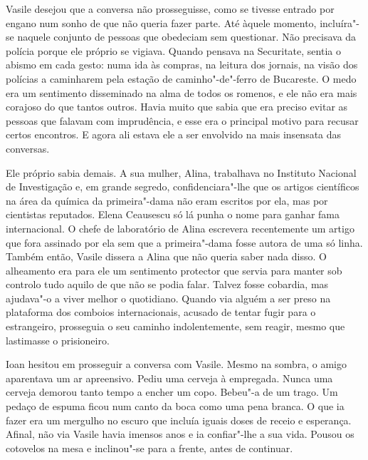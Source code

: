 Vasile desejou que a conversa não prosseguisse, como se tivesse entrado
por engano num sonho de que não queria fazer parte. Até àquele momento,
incluíra"-se naquele conjunto de pessoas que obedeciam sem questionar.
Não precisava da polícia porque ele próprio se vigiava. Quando pensava
na Securitate, sentia o abismo em cada gesto: numa ida às compras, na
leitura dos jornais, na visão dos polícias a caminharem pela estação de
caminho"-de"-ferro de Bucareste. O medo era um sentimento disseminado na
alma de todos os romenos, e ele não era mais corajoso do que tantos
outros. Havia muito que sabia que era preciso evitar as pessoas que
falavam com imprudência, e esse era o principal motivo para recusar
certos encontros. E agora ali estava ele a ser envolvido na mais
insensata das conversas.

Ele próprio sabia demais. A sua mulher, Alina, trabalhava no Instituto Nacional de Investigação e, em grande segredo,
confidenciara"-lhe que os artigos científicos na área da química da
primeira"-dama não eram escritos por ela, mas por cientistas reputados.
Elena Ceausescu só lá punha o nome para ganhar fama internacional. O
chefe de laboratório de Alina escrevera recentemente um artigo que
fora assinado por ela sem que a primeira"-dama fosse autora de uma só
linha. Também então, Vasile dissera a Alina que não queria saber nada
disso. O alheamento era para ele um sentimento protector que servia para
manter sob controlo tudo aquilo de que não se podia falar. Talvez fosse
cobardia, mas ajudava"-o a viver melhor o quotidiano. Quando via alguém
a ser preso na plataforma dos comboios internacionais, acusado de tentar
fugir para o estrangeiro, prosseguia o seu caminho indolentemente, sem
reagir, mesmo que lastimasse o prisioneiro.

Ioan hesitou em prosseguir a conversa com Vasile. Mesmo na sombra, o
amigo aparentava um ar apreensivo. Pediu uma cerveja à empregada. Nunca
uma cerveja demorou tanto tempo a encher um copo. Bebeu"-a de um trago.
Um pedaço de espuma ficou num canto da boca como uma pena branca. O que
ia fazer era um mergulho no escuro que incluía iguais doses de receio e
esperança. Afinal, não via Vasile havia imensos anos e ia confiar"-lhe a
sua vida. Pousou os cotovelos na mesa e inclinou"-se para a frente, antes
de continuar.

